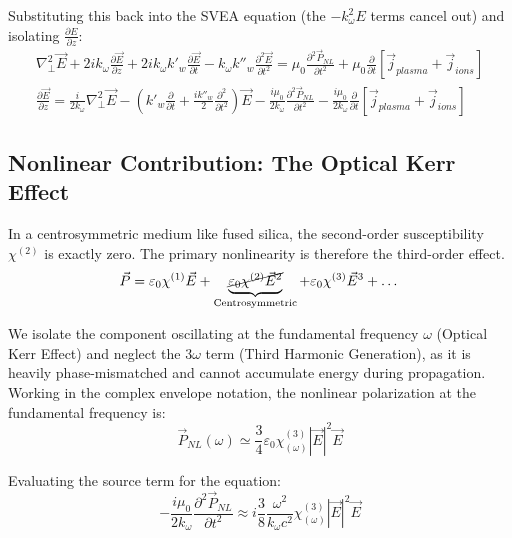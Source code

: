 Substituting this back into the SVEA equation (the $-k_{\omega}^2 E$ terms cancel out) and isolating $\frac{\partial E}{\partial z}$:
\begin{align}
\nabla_\perp^2 \vec{E} + 2 i k_{\omega} \frac{\partial \vec{E}}{\partial z} + 2 i k_{\omega} k'_w \frac{\partial \vec{E}}{\partial t} - k_{\omega} k''_w \frac{\partial^2 \vec{E}}{\partial t^2} = \mu_0 \frac{\partial^2 \vec{P}_{NL}}{\partial t^2} + \mu_0 \frac{\partial}{\partial t} [\vec{j}_{plasma} + \vec{j}_{ions}] \nonumber \\
\frac{\partial \vec{E}}{\partial z} = \frac{i}{2 k_{\omega}} \nabla_\perp^2 \vec{E} - \left( k'_w \frac{\partial}{\partial t} + \frac{i k''_w}{2} \frac{\partial^2}{\partial t^2} \right)\vec{E} - \frac{i \mu_0}{2 k_{\omega}} \frac{\partial^2 \vec{P}_{NL}}{\partial t^2} - \frac{i \mu_0}{2 k_{\omega}} \frac{\partial}{\partial t} [\vec{j}_{plasma} + \vec{j}_{ions}]
\end{align}

\subsection*{Nonlinear Contribution: The Optical Kerr Effect}
In a centrosymmetric medium like fused silica, the second-order susceptibility $\chi^{(2)}$ is exactly zero. The primary nonlinearity is therefore the third-order effect.
\begin{equation*}
\vec{P} = \varepsilon_0 \chi^{(1)}\vec{E}  + \underbrace{\cancel{\varepsilon_0 \chi^{(2)} \vec{E}^2}}_{\text{Centrosymmetric}} + \varepsilon_0 \chi^{(3)} \vec{E}^3 + \dots
\end{equation*}

We isolate the component oscillating at the fundamental frequency $\omega$ (Optical Kerr Effect) and neglect the $3\omega$ term (Third Harmonic Generation), as it is heavily phase-mismatched and cannot accumulate energy during propagation. Working in the complex envelope notation, the nonlinear polarization at the fundamental frequency is:
\begin{equation}
\vec{P}_{NL}(\omega) \simeq \frac{3}{4} \varepsilon_0 \chi^{(3)}_{(\omega)} |\vec{E}|^2 \vec{E}
\end{equation}

Evaluating the source term for the equation:
\begin{equation}
- \frac{i \mu_0}{2 k_{\omega}} \frac{\partial^2 \vec{P}_{NL}}{\partial t^2} \approx i \frac{3}{8} \frac{\omega^2}{k_{\omega} c^2} \chi^{(3)}_{(\omega)} |\vec{E}|^2 \vec{E}
\end{equation}

